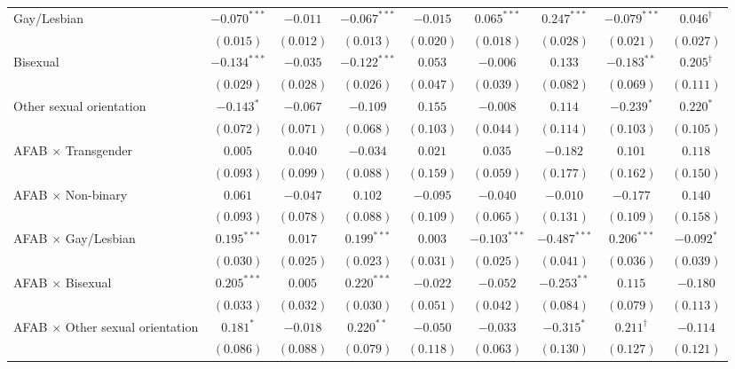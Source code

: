 \begin{table}[htpb]
\begin{adjustbox}{max totalsize={\textwidth}{0.76\textheight},center}
\begin{tabular}{l c c c c c c c c}
Gay/Lesbian & ${-0.070}^{***}$ & ${-0.011}$ & ${-0.067}^{***}$ & ${-0.015}$ & ${0.065}^{***}$ & ${0.247}^{***}$ & ${-0.079}^{***}$ & ${0.046}^{\dagger}$ \\
 & $(0.015)$ & $(0.012)$ & $(0.013)$ & $(0.020)$ & $(0.018)$ & $(0.028)$ & $(0.021)$ & $(0.027)$ \\
Bisexual & ${-0.134}^{***}$ & ${-0.035}$ & ${-0.122}^{***}$ & ${0.053}$ & ${-0.006}$ & ${0.133}$ & ${-0.183}^{**}$ & ${0.205}^{\dagger}$ \\
 & $(0.029)$ & $(0.028)$ & $(0.026)$ & $(0.047)$ & $(0.039)$ & $(0.082)$ & $(0.069)$ & $(0.111)$ \\
Other sexual orientation & ${-0.143}^{*}$ & ${-0.067}$ & ${-0.109}$ & ${0.155}$ & ${-0.008}$ & ${0.114}$ & ${-0.239}^{*}$ & ${0.220}^{*}$ \\
 & $(0.072)$ & $(0.071)$ & $(0.068)$ & $(0.103)$ & $(0.044)$ & $(0.114)$ & $(0.103)$ & $(0.105)$ \\
AFAB $\times$ Transgender & ${0.005}$ & ${0.040}$ & ${-0.034}$ & ${0.021}$ & ${0.035}$ & ${-0.182}$ & ${0.101}$ & ${0.118}$ \\
 & $(0.093)$ & $(0.099)$ & $(0.088)$ & $(0.159)$ & $(0.059)$ & $(0.177)$ & $(0.162)$ & $(0.150)$ \\
AFAB $\times$ Non-binary & ${0.061}$ & ${-0.047}$ & ${0.102}$ & ${-0.095}$ & ${-0.040}$ & ${-0.010}$ & ${-0.177}$ & ${0.140}$ \\
 & $(0.093)$ & $(0.078)$ & $(0.088)$ & $(0.109)$ & $(0.065)$ & $(0.131)$ & $(0.109)$ & $(0.158)$ \\
AFAB $\times$ Gay/Lesbian & ${0.195}^{***}$ & ${0.017}$ & ${0.199}^{***}$ & ${0.003}$ & ${-0.103}^{***}$ & ${-0.487}^{***}$ & ${0.206}^{***}$ & ${-0.092}^{*}$ \\
 & $(0.030)$ & $(0.025)$ & $(0.023)$ & $(0.031)$ & $(0.025)$ & $(0.041)$ & $(0.036)$ & $(0.039)$ \\
AFAB $\times$ Bisexual & ${0.205}^{***}$ & ${0.005}$ & ${0.220}^{***}$ & ${-0.022}$ & ${-0.052}$ & ${-0.253}^{**}$ & ${0.115}$ & ${-0.180}$ \\
 & $(0.033)$ & $(0.032)$ & $(0.030)$ & $(0.051)$ & $(0.042)$ & $(0.084)$ & $(0.079)$ & $(0.113)$ \\
AFAB $\times$ Other sexual orientation & ${0.181}^{*}$ & ${-0.018}$ & ${0.220}^{**}$ & ${-0.050}$ & ${-0.033}$ & ${-0.315}^{*}$ & ${0.211}^{\dagger}$ & ${-0.114}$ \\
 & $(0.086)$ & $(0.088)$ & $(0.079)$ & $(0.118)$ & $(0.063)$ & $(0.130)$ & $(0.127)$ & $(0.121)$ \\

\end{tabular}
\end{adjustbox}
\end{table}
